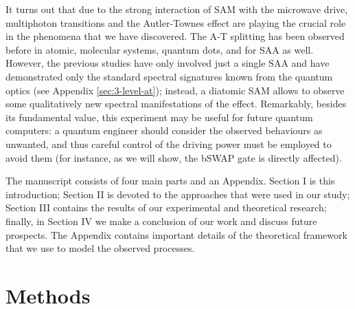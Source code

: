 \documentclass[%
 aip,
 amsmath,amssymb,
 reprint,%
]{revtex4-1}
\begin{document}
It turns out that due to the strong interaction of SAM with the microwave drive, multiphoton transitions and the Autler-Townes effect are playing the crucial role in the phenomena that we have discovered. The A-T splitting has been observed before in atomic\cite{picque1976direct}, molecular systems\cite{tamarat1995pump}, quantum dots\cite{xu2007coherent}, and for SAA as well\cite{baur2009measurement, sillanpaa2009autler, novikov2013autler, suri2013observation, peng2018vacuum}. However, the previous studies have  only involved just a single SAA and have demonstrated only the standard spectral signatures known from the quantum optics (see Appendix \ref{sec:3-level-at}); instead, a diatomic SAM allows to observe some qualitatively new spectral manifestations of the effect. Remarkably, besides its fundamental value, this experiment may be useful for future quantum computers: a quantum engineer should consider the observed behaviours as unwanted, and thus careful control of the driving power must be employed to avoid them (for instance, as we will show, the bSWAP gate\cite{poletto2012entanglement} is directly affected).

The manuscript consists of four main parts and an Appendix. Section I is this introduction; Section II is devoted to the approaches that were used in our study; Section III contains the results of our experimental and theoretical research; finally, in Section IV we make a conclusion of our work and discuss future prospects. The Appendix contains important details of the theoretical framework that we use to model the observed processes.

\section{Methods}
\end{document}
